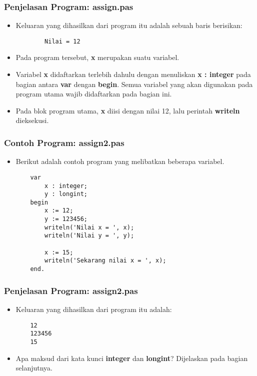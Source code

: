 \documentclass{beamer}
\begin{document}
\begin{frame}[fragile]
\frametitle{Penjelasan Program: assign.pas}
\begin{itemize}
	\item Keluaran yang dihasilkan dari program itu adalah sebuah baris berisikan:
	\begin{lstlisting}
		Nilai = 12
	\end{lstlisting}
	\item Pada program tersebut, \textbf{x} merupakan suatu variabel.
	\item Variabel \textbf{x} didaftarkan terlebih dahulu dengan menuliskan \textbf{x : integer} pada bagian antara \textbf{var} dengan \textbf{begin}. Semua variabel yang akan digunakan pada program utama wajib didaftarkan pada bagian ini.
	\item Pada blok program utama, \textbf{x} diisi dengan nilai 12, lalu perintah \textbf{writeln} dieksekusi.
\end{itemize}
\end{frame}

\begin{frame}[fragile]
\frametitle{Contoh Program: assign2.pas}
\begin{itemize}
	\item Berikut adalah contoh program yang melibatkan beberapa variabel.
	\begin{lstlisting}
	var
	    x : integer;
	    y : longint;
	begin
	    x := 12;
	    y := 123456;
	    writeln('Nilai x = ', x);
	    writeln('Nilai y = ', y);
	    
	    x := 15;
	    writeln('Sekarang nilai x = ', x);
	end.
	\end{lstlisting}
\end{itemize}
\end{frame}

\begin{frame}[fragile]
\frametitle{Penjelasan Program: assign2.pas}
\begin{itemize}
	\item Keluaran yang dihasilkan dari program itu adalah:
	\begin{lstlisting}
	12
	123456
	15
	\end{lstlisting}
	\item Apa maksud dari kata kunci \textbf{integer} dan \textbf{longint}? Dijelaskan pada bagian selanjutnya.
\end{itemize}
\end{frame}
\end{document}
